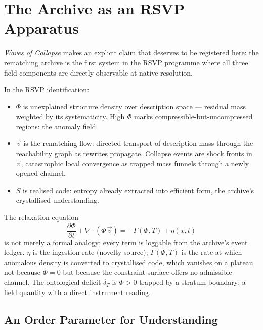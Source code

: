 \documentclass[11pt, a4paper, openany]{book}
\theoremstyle{plain}
\theoremstyle{definition}
\theoremstyle{remark}
\begin{document}
\section{The Archive as an RSVP Apparatus}

\emph{Waves of Collapse} makes an explicit claim that deserves to be registered here:
the rematching archive is the first system in the RSVP programme where all three
field components are directly observable at native resolution.

In the RSVP identification:
\begin{itemize}
  \item $\Phi$ is unexplained structure density over description space --- residual
    mass weighted by its systematicity.
    High $\Phi$ marks compressible-but-uncompressed regions: the anomaly field.
  \item $\vec{v}$ is the rematching flow: directed transport of description mass
    through the reachability graph as rewrites propagate.
    Collapse events are shock fronts in $\vec{v}$,
    catastrophic local convergence as trapped mass funnels through a newly opened channel.
  \item $S$ is realised code: entropy already extracted into efficient form,
    the archive's crystallised understanding.
\end{itemize}

The relaxation equation
\[
  \frac{\partial \Phi}{\partial t} + \nabla \cdot (\Phi\, \vec{v})
  = -\Gamma(\Phi, T) + \eta(x,t)
\]
is not merely a formal analogy; every term is loggable from the archive's
event ledger.
$\eta$ is the ingestion rate (novelty source); $\Gamma(\Phi, T)$ is the
rate at which anomalous density is converted to crystallised code,
which vanishes on a plateau not because $\Phi = 0$ but because the constraint
surface offers no admissible channel.
The ontological deficit $\delta_T$ is $\Phi > 0$ trapped by a stratum boundary:
a field quantity with a direct instrument reading.

\subsection{An Order Parameter for Understanding}
\end{document}

